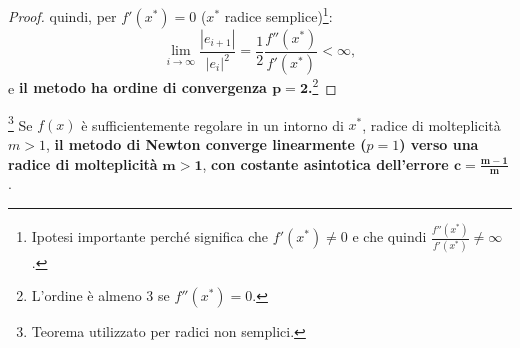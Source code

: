 \begin{proof}
	
	\noindent quindi, per $f'(x^*)=0$ ($x^*$ radice semplice)\footnote{Ipotesi importante perché significa che $f'(x^*)\neq 0$ e che quindi $\frac{f''(x^*)}{f'(x^*)}\neq\infty$.}:
	\begin{equation*}
		\lim_{i\to\infty}{\frac{|e_{i+1}|}{|e_i|^2}}=\frac{1}{2}\frac{f''(x^*)}{f'(x^*)}<\infty,
	\end{equation*}
	e \textbf{il metodo ha ordine di convergenza $\boldsymbol{p=2}$.}\footnote{L'ordine è almeno 3 se $f''(x^*)=0$.}
\end{proof}

\begin{theorem}\label{th:convLineareNewt}
	\footnote{Teorema utilizzato per radici non semplici.}
	Se $f(x)$ è sufficientemente regolare in un intorno di $x^*$, radice di molteplicità $m>1$, \textbf{il metodo di Newton converge linearmente ($p=1$) verso una radice di molteplicità} $\boldsymbol{m>1}$, \textbf{con costante asintotica dell'errore $\boldsymbol{c=\frac{m-1}{m}}$}.
\end{theorem}
